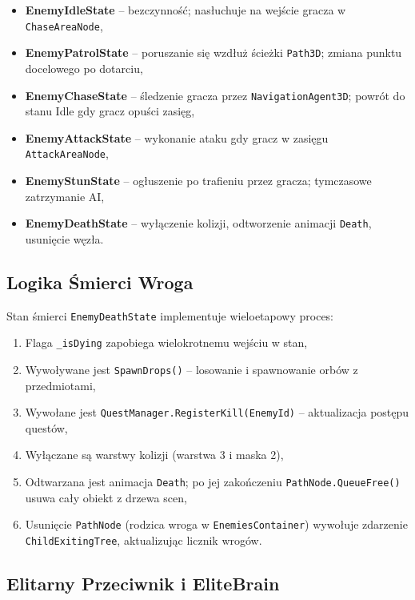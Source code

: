 \begin{itemize}
    \item \textbf{EnemyIdleState} – bezczynność; nasłuchuje na wejście gracza w \texttt{ChaseAreaNode},
    \item \textbf{EnemyPatrolState} – poruszanie się wzdłuż ścieżki \texttt{Path3D}; zmiana punktu docelowego po dotarciu,
    \item \textbf{EnemyChaseState} – śledzenie gracza przez \texttt{NavigationAgent3D}; powrót do stanu Idle gdy gracz opuści zasięg,
    \item \textbf{EnemyAttackState} – wykonanie ataku gdy gracz w zasięgu \texttt{AttackAreaNode},
    \item \textbf{EnemyStunState} – ogłuszenie po trafieniu przez gracza; tymczasowe zatrzymanie AI,
    \item \textbf{EnemyDeathState} – wyłączenie kolizji, odtworzenie animacji \texttt{Death}, usunięcie węzła.
\end{itemize}

\subsection{Logika Śmierci Wroga}

Stan śmierci \texttt{EnemyDeathState} implementuje wieloetapowy proces:

\begin{enumerate}
    \item Flaga \texttt{\_isDying} zapobiega wielokrotnemu wejściu w stan,
    \item Wywoływane jest \texttt{SpawnDrops()} – losowanie i spawnowanie orbów z przedmiotami,
    \item Wywołane jest \texttt{QuestManager.RegisterKill(EnemyId)} – aktualizacja postępu questów,
    \item Wyłączane są warstwy kolizji (warstwa 3 i maska 2),
    \item Odtwarzana jest animacja \texttt{Death}; po jej zakończeniu \texttt{PathNode.QueueFree()} usuwa cały obiekt z drzewa scen,
    \item Usunięcie \texttt{PathNode} (rodzica wroga w \texttt{EnemiesContainer}) wywołuje zdarzenie \texttt{ChildExitingTree}, aktualizując licznik wrogów.
\end{enumerate}

\subsection{Elitarny Przeciwnik i EliteBrain}

